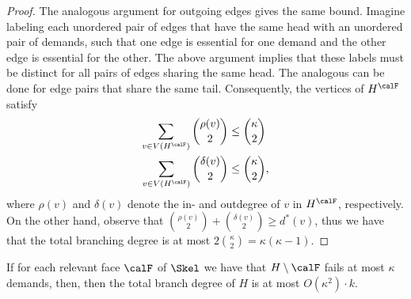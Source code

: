 \begin{proof}
The analogous argument for outgoing edges gives the same bound. Imagine labeling each unordered pair of edges that have the same head with an unordered pair of demands, such that one edge is essential for one demand and the other edge is essential for the other. The above argument implies that these labels must be distinct for all pairs of edges sharing the same head. The analogous can be done for edge pairs that share the same tail. Consequently, the vertices of $H^\calF$ satisfy 
\begin{align*}
\sum_{v\in V(H^\calF)} \binom{\rho(v)}{2} &\leq \binom{\kappa}{2}\\
\sum_{v\in V(H^\calF)} \binom{\delta(v)}{2} &\leq \binom{\kappa}{2},
\end{align*}
where $\rho(v)$ and $\delta(v)$ denote the in- and outdegree of $v$ in $H^\calF$, respectively. On the other hand, observe that $\binom{\rho(v)}{2} + \binom{\delta(v)}{2} \geq d^*(v)$, thus we have that the total branching degree is at most $2\binom{\kappa}{2}=\kappa(\kappa-1)$.
\end{proof}

\begin{lemma}\label{lem:cbound_face_to_full}
If for each relevant face $\calF$ of $\Skel$ we have that $H\setminus \calF$ fails at most $\kappa$ demands, then, then the total branch degree of $H$ is at most $O(\kappa^2)\cdot k$.
\end{lemma}

